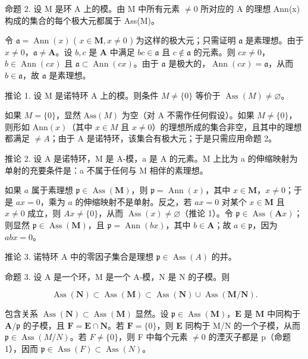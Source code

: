 命题 2. 设 M 是环 A 上的模。由 M 中所有元素 \(\neq0\) 所对应的 A 的理想 Ann(x) 构成的集合的每个极大元都属于 Ass(M)。

令 \(\mathfrak{a} = \operatorname{Ann}(x)\) ( \(x \in \mathbf{M}, x \neq 0\) ) 为这样的极大元；只需证明 \(\mathfrak{a}\) 是素理想。由于 \(x \neq 0\)，\(\mathfrak{a} \neq \mathbf{A}\)。设 \(b, c\) 是 \(\mathbf{A}\) 中满足 \(bc \in \mathfrak{a}\) 且 \(c \notin \mathfrak{a}\) 的元素。则 \(cx \neq 0\)，\(b \in \operatorname{Ann}(cx)\) 且 \(\mathfrak{a} \subset \operatorname{Ann}(cx)\)。由于 \(\mathfrak{a}\) 是极大的，\(\operatorname{Ann}(cx) = \mathfrak{a}\)，从而 \(b \in \mathfrak{a}\)，故 \(\mathfrak{a}\) 是素理想。

推论 1. 设 M 是诺特环 A 上的模。则条件 \(M \neq \{0\}\) 等价于 \(\operatorname{Ass}(M) \neq \varnothing\)。

如果 \(M = \{0\}\)，显然 \(\text{Ass}(M)\) 为空（对 A 不需作任何假设）。如果 \(M \neq \{0\}\)，则形如 \(\text{Ann}(x)\)（其中 \(x \in M\) 且 \(x \neq 0\)）的理想所成的集合非空，且其中的理想都满足 \(\neq A\)；由于 A 是诺特环，该集合有极大元；于是只需应用命题 2。

推论 2. 设 A 是诺特环，M 是 A-模，a 是 A 的元素。M 上比为 a 的伸缩映射为单射的充要条件是：a 不属于任何与 M 相伴的素理想。

如果 \(a\) 属于素理想 \(\mathfrak{p} \in \operatorname{Ass}(\mathbf{M})\)，则 \(\mathfrak{p} = \operatorname{Ann}(x)\)，其中 \(x \in \mathbf{M}\)，\(x \neq 0\)；于是 \(ax = 0\)，乘为 \(a\) 的伸缩映射不是单射。反之，若 \(ax = 0\) 对某个 \(x \in \mathbf{M}\) 且 \(x \neq 0\) 成立，则 \(Ax \neq \{0\}\)，从而 \(\operatorname{Ass}(x) \neq \varnothing\)（推论 1）。令 \(\mathfrak{p} \in \operatorname{Ass}(\mathbf{A}x)\)；则显然 \(\mathfrak{p} \in \operatorname{Ass}(\mathbf{M})\)，且 \(\mathfrak{p} = \operatorname{Ann}(bx)\)，其中 \(b \in \mathbf{A}\)；故 \(a \in \mathfrak{p}\)，因为 \(abx = 0\)。

推论 3. 诺特环 A 中的零因子集合是理想 \(\mathfrak{p} \in \operatorname{Ass}(A)\) 的并。

命题 3. 设 A 是一个环，M 是一个 A-模，N 是 N 的子模。则

\[
\operatorname{Ass} (\mathbf {N}) \subset \operatorname{Ass} (\mathbf {M}) \subset \operatorname{Ass} (\mathbf {N}) \cup \operatorname{Ass} (\mathbf {M} / \mathbf {N}).\tag{2}
\]

包含关系 \(\operatorname{Ass}(\mathbf{N}) \subset \operatorname{Ass}(\mathbf{M})\) 显然。设 \(\mathfrak{p} \in \operatorname{Ass}(\mathbf{M})\)，\(\mathbf{E}\) 是 \(\mathbf{M}\) 中同构于 \(\mathbf{A} / \mathfrak{p}\) 的子模，且 \(\mathbf{F} = \mathbf{E} \cap \mathbf{N}\)。若 \(\mathbf{F} = \{0\}\)，则 \(\mathbf{E}\) 同构于 M/N 的一个子模，从而 \(\mathfrak{p} \in \operatorname{Ass}(M/N)\)。若 \(F \neq \{0\}\)，则 F 中每个元素 \(\neq 0\) 的湮灭子都是 p（命题 1），因而 \(\mathfrak{p} \in \operatorname{Ass}(F) \subset \operatorname{Ass}(N)\)。

